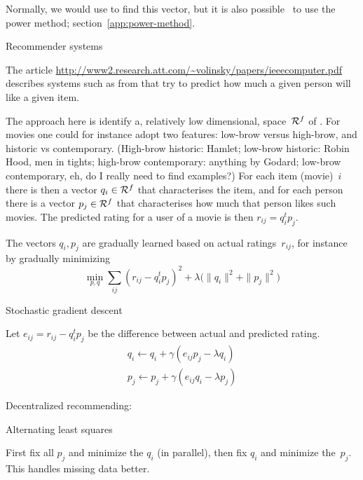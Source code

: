 Normally, we would use  to find this vector,
but it is also possible~\cite{LinCohen:PIC} to use the power method;
section~\ref{app:power-method}.


 {Recommender systems}

The article 
\url{http://www2.research.att.com/~volinsky/papers/ieeecomputer.pdf}
describes systems such as from 
that try to predict how much a given person will like a given item.

The approach here is identify a, relatively low dimensional, space~${\cal R}^f$
of . For movies one could for instance adopt two features:
low-brow versus high-brow, and historic vs contemporary.
(High-brow historic: Hamlet; low-brow historic: Robin Hood, men in tights; 
high-brow contemporary: anything by Godard; low-brow contemporary, eh, 
do I really need to find examples?)
For each item (movie)~$i$ there is then a vector $q_i\in{\cal R}^f$ that characterises
the item, and for each person there is a vector $p_j\in{\cal R}^f$ that
characterises how much that person likes such movies. The predicted rating
for a user of a movie is then $r_{ij}=q_i^tp_j$.

The vectors $q_i,p_j$ are gradually learned based on actual
ratings~$r_{ij}$, for instance by gradually minimizing
\[ \min_{p,q} \sum_{ij} (r_{ij}-q_i^tp_j)^2+
    \lambda \bigl( \|q_i\|^2+\|p_j\|^2 \bigr)
\]

 {Stochastic gradient descent}

Let $e_{ij}=r_{ij}-q_i^tp_j$ be the difference between actual and predicted rating.
\[
\begin{array}{l}
  q_i\leftarrow q_i+\gamma (e_{ij}p_j-\lambda q_i)\\
  p_j\leftarrow p_j+\gamma (e_{ij}q_i-\lambda p_j)
\end{array}
\]

Decentralized recommending:~\cite{Zheng:2016arXiv:decentral-recommend}

 {Alternating least squares}

First fix all $p_j$ and minimize the $q_i$ (in parallel),
then fix $q_i$ and minimize the~$p_j$.
This handles missing data better.

